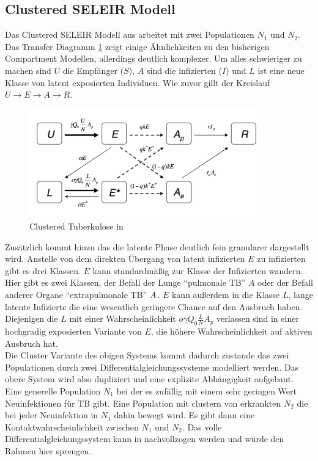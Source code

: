 \documentclass[paper=a4, fontsize=11pt, ngerman, abstract=on]{scrartcl}
\numberwithin{equation}{section} %
\numberwithin{figure}{section} %
\numberwithin{table}{section} %
\begin{document}
\subsection{Clustered SELEIR Modell}

Das Clustered SELEIR Modell aus \cite{ModellingTBEpidemics2009} arbeitet mit zwei Populationen $N_{1}$ und $N_{2}$. Das Transfer Diagramm \ref{fig:clustered-seleir} zeigt einige Ähnlichkeiten zu den bisherigen Compartment Modellen, allerdings deutlich komplexer. Um alles schwieriger zu machen sind $U$ die Empfänger ($S$), $A$ sind die infizierten ($I$) und $L$ ist eine neue Klasse von latent exposierten Individuen. Wie zuvor gillt der Kreislauf $U \rightarrow E \rightarrow A \rightarrow R$.

\begin{figure}[ht]
  \centering
  \includegraphics[width=0.9\textwidth,keepaspectratio]{images/clustered_seleir_model}
  \caption{Clustered Tuberkulose in \cite{ModellingTBEpidemics2009}}
  \label{fig:clustered-seleir}
\end{figure}

Zusätzlich kommt hinzu das die latente Phase deutlich fein granularer dargestellt wird. Anstelle von dem direkten Übergang von latent infizierten $E$ zu infizierten gibt es drei Klassen. $E$ kann standardmäßig zur Klasse der Infizierten wandern. Hier gibt es zwei Klassen, der Befall der Lunge ``pulmonale TB'' $A$ oder der Befall anderer Organe ``extrapulmonale TB'' $A^{\*}$. $E$ kann außerdem in die Klasse $L$, lange latente Infizierte die eine wesentlich geringere Chance auf den Ausbruch haben. Diejenigen die $L$ mit einer Wahrscheinlichkeit $o\gamma Q_{0}\frac{L}{N}A_{p}$ verlassen sind in einer hochgradig exposierten Variante von $E$, die höhere Wahrscheinlichkeit auf aktiven Ausbruch hat. \\

Die Cluster Variante des obigen Systems kommt dadurch zustande das zwei Populationen durch zwei Differentialgleichungssysteme modelliert werden. Das obere System wird also dupliziert und eine explizite Abhängigkeit aufgebaut. Eine generelle Population $N_{1}$ bei der es zufällig mit einem sehr geringen Wert Neuinfektionen für TB gibt. Eine Population mit clustern von erkrankten $N_{2}$ die bei jeder Neuinfektion in $N_{1}$ dahin bewegt wird. Es gibt dann eine Kontaktwahrscheinlichkeit zwischen $N_{1}$ und $N_{2}$. Das volle Differentialgleichungssystem kann in \cite{ModellingTBEpidemics2009} nachvollzogen werden und würde den Rahmen hier sprengen.
\end{document}
